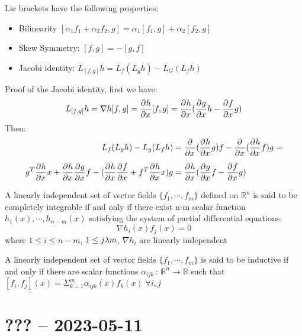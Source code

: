 \mlenma{}
{
    Lie brackets have the following properties:
    \begin{itemize}
        \item Bilinearity $[\alpha_1 f_1 + \alpha_2 f_2,g] = \alpha_1[f_1,g] + \alpha_2[f_2,g]$
        \item Skew Symmetry: $[f,g] = -[g,f]$
        \item Jacobi identity:  $L_[f,g]h = L_f(L_g h)-L_G(L_f h)$
    \end{itemize}
}
\begin{myproof}
   Proof of the Jacobi identity, first we have:
   \begin{equation}
       L_{[f,g]}h = \nabla h[f,g] = \frac{\partial^{}h}{\partial x^{}}[f,g]= \frac{\partial^{}h}{\partial x^{}}( \frac{\partial^{}g}{\partial x^{}}h - \frac{\partial^{}f}{\partial x^{}}g)\\
   \end{equation}
   Then:
   \begin{equation}%
       \!\begin{aligned}
           L_f(L_g h) - L_g(L_f h) &= \pdv{}{x}( \pdv{h}{x}g ) f - \pdv{}{x}( \pdv{h}{x}f)g = \\[1.25ex]
           g^{T} \pdv{h}{x}{x} + \pdv{h}{x} \pdv{g}{x}f - ( \pdv{h}{x} \pdv{f}{x} + f^{T} \pdv{h}{x}{x})g&=\pdv{h}{x}( \pdv{g}{x}f - \pdv{f}{x}g)\\
       \end{aligned}
   \end{equation}
\end{myproof}

{
    A linearly independent set of vector fields $\{f_1,\cdots ,f_m\}$ defined on $\mathbb{R}^{n}$ is said to be completely integrable 
    if and only if there exist n-m scalar function $h_1(x), \cdots, h_{n-m}(x)$ satisfying the system of partial differential
    equations:
    \begin{equation}
        \nabla h_i(x) f_j(x) = 0
    \end{equation}
    where $1 \le i \le n-m$,  $1\le j \lambda m$,  $\nabla h_i$ are linearly independent
}


{
    A linearly independent set of vector fields $\{f_1,\cdots ,f_m\}$ is said to be inductive if and only if there are scalar functions $\alpha_{ijk}\,:\,\mathbb{R}^{n} \longrightarrow \mathbb{R} $ such that $[f_i,f_j](x)  = \Sigma^m_{k=1} \alpha_{ijk}(x)f_k(x) \; \forall i,j $
}
\section{??? -- 2023-05-11}



